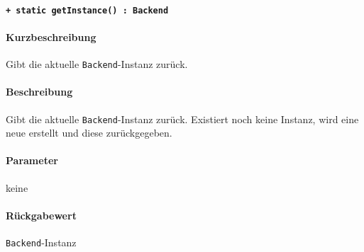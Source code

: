 \paragraph{\texttt{+ static getInstance() : Backend}}%
\paragraph*{Kurzbeschreibung}
Gibt die aktuelle \verb#Backend#-Instanz zurück.
\paragraph*{Beschreibung}
Gibt die aktuelle \verb#Backend#-Instanz zurück.
Existiert noch keine Instanz, wird eine neue erstellt und diese zurückgegeben.
\paragraph*{Parameter}
keine
\paragraph*{Rückgabewert}
\verb#Backend#-Instanz